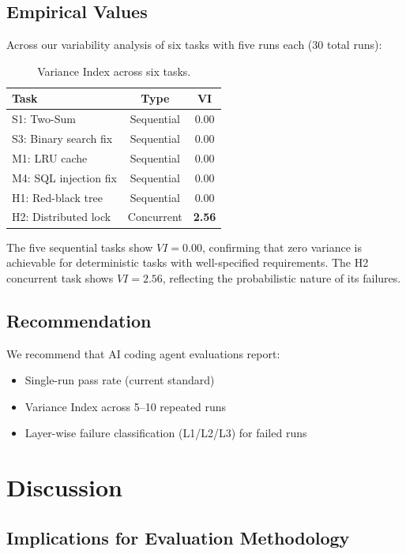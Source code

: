 \documentclass[conference]{IEEEtran}
\begin{document}
\subsection{Empirical Values}

Across our variability analysis of six tasks with five runs each (30 total runs):

\begin{table}[h]
\centering
\caption{Variance Index across six tasks.}
\label{tab:vi}
\begin{tabular}{lcc}
\toprule
Task & Type & VI \\
\midrule
S1: Two-Sum & Sequential & 0.00 \\
S3: Binary search fix & Sequential & 0.00 \\
M1: LRU cache & Sequential & 0.00 \\
M4: SQL injection fix & Sequential & 0.00 \\
H1: Red-black tree & Sequential & 0.00 \\
H2: Distributed lock & Concurrent & \textbf{2.56} \\
\bottomrule
\end{tabular}
\end{table}

The five sequential tasks show $VI = 0.00$, confirming that zero variance is achievable for deterministic tasks with well-specified requirements.
The H2 concurrent task shows $VI = 2.56$, reflecting the probabilistic nature of its failures.

\subsection{Recommendation}

We recommend that AI coding agent evaluations report:
\begin{itemize}
\item Single-run pass rate (current standard)
\item Variance Index across 5--10 repeated runs
\item Layer-wise failure classification (L1/L2/L3) for failed runs
\end{itemize}

\section{Discussion}

\subsection{Implications for Evaluation Methodology}
\end{document}
